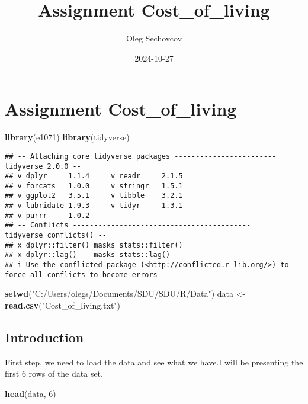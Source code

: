 \documentclass[
]{article}
\title{Assignment Cost\_of\_living}
\author{Oleg Sechovcov}
\date{2024-10-27}
\newenvironment{Shaded}{\begin{snugshade}}{\end{snugshade}}
\newcommand{\DecValTok}[1]{\textcolor[rgb]{0.00,0.00,0.81}{#1}}
\newcommand{\FunctionTok}[1]{\textcolor[rgb]{0.13,0.29,0.53}{\textbf{#1}}}
\newcommand{\NormalTok}[1]{#1}
\newcommand{\OtherTok}[1]{\textcolor[rgb]{0.56,0.35,0.01}{#1}}
\newcommand{\StringTok}[1]{\textcolor[rgb]{0.31,0.60,0.02}{#1}}
\begin{document}
\maketitle

\section{Assignment Cost\_of\_living}\label{assignment-cost_of_living}

\begin{Shaded}
\begin{Highlighting}[]
\FunctionTok{library}\NormalTok{(e1071)}
\FunctionTok{library}\NormalTok{(tidyverse)}
\end{Highlighting}
\end{Shaded}

\begin{verbatim}
## -- Attaching core tidyverse packages ------------------------ tidyverse 2.0.0 --
## v dplyr     1.1.4     v readr     2.1.5
## v forcats   1.0.0     v stringr   1.5.1
## v ggplot2   3.5.1     v tibble    3.2.1
## v lubridate 1.9.3     v tidyr     1.3.1
## v purrr     1.0.2     
## -- Conflicts ------------------------------------------ tidyverse_conflicts() --
## x dplyr::filter() masks stats::filter()
## x dplyr::lag()    masks stats::lag()
## i Use the conflicted package (<http://conflicted.r-lib.org/>) to force all conflicts to become errors
\end{verbatim}

\begin{Shaded}
\begin{Highlighting}[]
\FunctionTok{setwd}\NormalTok{(}\StringTok{"C:/Users/olegs/Documents/SDU/SDU/R/Data"}\NormalTok{)}
\NormalTok{data }\OtherTok{\textless{}{-}} \FunctionTok{read.csv}\NormalTok{(}\StringTok{"Cost\_of\_living.txt"}\NormalTok{)}
\end{Highlighting}
\end{Shaded}

\subsection{Introduction}\label{introduction}

First step, we need to load the data and see what we have.I will be
presenting the first 6 rows of the data set.

\begin{Shaded}
\begin{Highlighting}[]
\FunctionTok{head}\NormalTok{(data, }\DecValTok{6}\NormalTok{)}
\end{Highlighting}
\end{Shaded}
\end{document}

